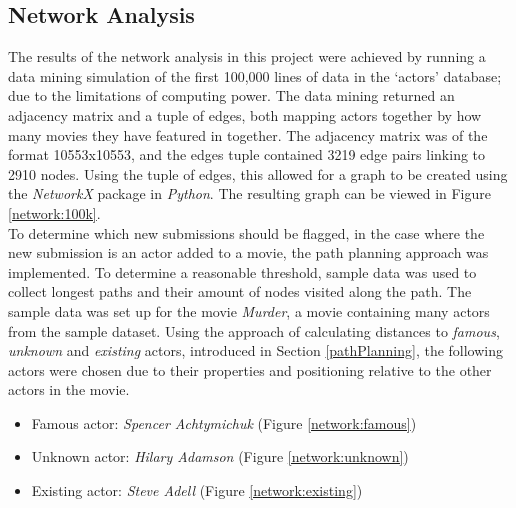 \documentclass[12pt]{ieeeconf}      %
\begin{document}
\subsection{Network Analysis}
\indent The results of the network analysis in this project were achieved by running a data mining simulation of the first 100,000 lines of data in the `actors' database; due to the limitations of computing power. The data mining returned an adjacency matrix and a tuple of edges, both mapping actors together by how many movies they have featured in together. The adjacency matrix was of the format 10553x10553, and the edges tuple contained 3219 edge pairs linking to 2910 nodes. Using the tuple of edges, this allowed for a graph to be created using the \textit{NetworkX} package in \textit{Python}. The resulting graph can be viewed in Figure \ref{network:100k}.
\\
\indent To determine which new submissions should be flagged, in the case where the new submission is an actor added to a movie, the path planning approach was implemented. To determine a reasonable threshold, sample data was used to collect longest paths and their amount of nodes visited along the path. The sample data was set up for the movie \textit{Murder}, a movie containing many actors from the sample dataset. Using the approach of calculating distances to \textit{famous}, \textit{unknown} and \textit{existing} actors, introduced in Section \ref{pathPlanning}, the following actors were chosen due to their properties and positioning relative to the other actors in the movie.

\begin{itemize}
\item Famous actor: \textit{Spencer Achtymichuk} (Figure \ref{network:famous})
\item Unknown actor: \textit{Hilary Adamson} (Figure \ref{network:unknown})
\item Existing actor: \textit{Steve Adell} (Figure \ref{network:existing})
\end{itemize}
\end{document}
